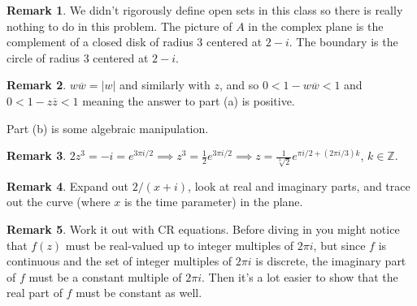 \documentclass[11pt,oneside]{amsart}
\theoremstyle{definition}
\newtheorem{remark}{Remark}
\newcommand{\bZ}{\mathbb{Z}}
\begin{document}
\begin{remark}
  We didn't rigorously define open sets in this class so there is really nothing to do in this problem. The picture of $A$ in the complex plane is the complement of a closed disk of radius 3 centered at $2-i$. The boundary is the circle of radius 3 centered at $2-i$.
\end{remark}

\begin{remark}
  $w\overline w=|w|$ and similarly with $z$, and so $0<1-w\overline w<1$ and $0<1-z\overline z<1$ meaning the answer to part (a) is positive.

  Part (b) is some algebraic manipulation.
\end{remark}

\begin{remark}
  $2z^3=-i=e^{3\pi i/2}\implies z^3=\frac 12 e^{3\pi i/2}\implies z=\frac 1{\sqrt[3]2}e^{\pi i/2+(2\pi i/3)k}$, $k\in\bZ$.
\end{remark}

\begin{remark}
  Expand out $2/(x+i)$, look at real and imaginary parts, and trace out the curve (where $x$ is the time parameter) in the plane.
\end{remark}

\begin{remark}
  Work it out with CR equations. Before diving in you might notice that $f(z)$ must be real-valued up to integer multiples of $2\pi i$, but since $f$ is continuous and the set of integer multiples of $2\pi i$ is discrete, the imaginary part of $f$ must be a constant multiple of $2\pi i$. Then it's a lot easier to show that the real part of $f$ must be constant as well.
\end{remark}
\end{document}
